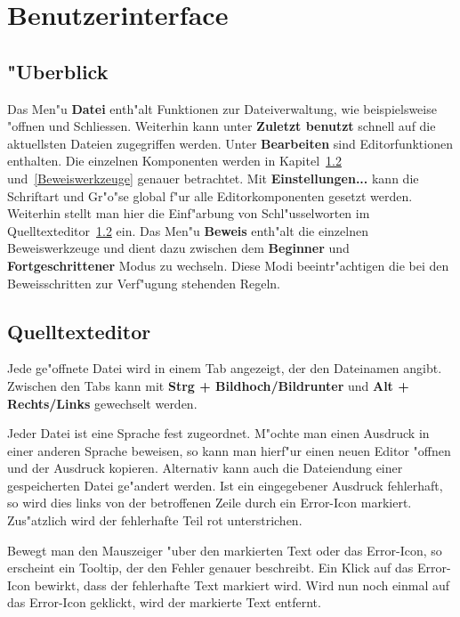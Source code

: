 
\chapter{Benutzerinterface}

\section{"Uberblick}

Das Men"u {\bf Datei} enth"alt Funktionen zur Dateiverwaltung, wie
beispielsweise "offnen und Schliessen. Weiterhin kann unter {\bf
Zuletzt benutzt} schnell auf die aktuellsten Dateien zugegriffen
werden. Unter {\bf Bearbeiten} sind Editorfunktionen enthalten. Die
einzelnen Komponenten werden in Kapitel~\ref{Qelltexteditor}
und~\ref{Beweiswerkzeuge} genauer betrachtet. Mit {\bf
Einstellungen...} kann die Schriftart und Gr"o"se global f"ur alle
Editorkomponenten gesetzt werden. Weiterhin stellt man hier die
Einf"arbung von Schl"usselworten im
Quelltexteditor~\ref{Qelltexteditor} ein. Das Men"u {\bf Beweis}
enth"alt die einzelnen Beweiswerkzeuge und dient dazu zwischen dem
{\bf Beginner} und {\bf Fortgeschrittener} Modus zu wechseln. Diese
Modi beeintr"achtigen die bei den Beweisschritten zur Verf"ugung
stehenden Regeln.

\section {Quelltexteditor}
\label{Qelltexteditor} Jede ge"offnete Datei wird in einem Tab
angezeigt, der den Dateinamen angibt. Zwischen den Tabs kann mit
{\bf Strg + Bildhoch/Bildrunter} und {\bf Alt + Rechts/Links}
gewechselt werden.

Jeder Datei ist eine Sprache fest zugeordnet. M"ochte man einen
Ausdruck in einer anderen Sprache beweisen, so kann man hierf"ur
einen neuen Editor "offnen und der Ausdruck kopieren. Alternativ
kann auch die Dateiendung einer gespeicherten Datei ge"andert
werden. Ist ein eingegebener Ausdruck fehlerhaft, so wird dies links
von der betroffenen Zeile durch ein Error-Icon markiert. Zus"atzlich 
wird der fehlerhafte Teil rot unterstrichen.

Bewegt man den Mauszeiger "uber den markierten Text oder das Error-Icon,
so erscheint ein Tooltip, der den Fehler genauer beschreibt. Ein Klick
auf das Error-Icon bewirkt, dass der fehlerhafte Text markiert wird. Wird
nun noch einmal auf das Error-Icon geklickt, wird der markierte Text
entfernt.

